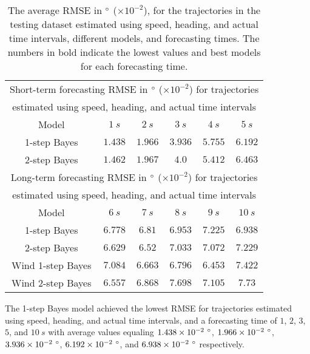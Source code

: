 \documentclass[preprint,12pt]{elsarticle}
\begin{document}
\begin{table}[!ht]
	\centering
	\begin{tabular}{|c|c|c|c|c|c|}
		\hline
		\multicolumn{6}{|c|}{Short-term forecasting RMSE in $\degree$ ($\times 10^{-2}$) for trajectories} \\ 
		\multicolumn{6}{|c|}{estimated using speed, heading, and actual time intervals} \\ \hline
		Model & $1 \ s$ & $2 \ s$ & $3 \ s$ & $4 \ s$ & $5 \ s$ \\ \hline
		1-step Bayes & $\mathbf{1.438}$ & $\mathbf{1.966}$ & $\mathbf{3.936}$ & $5.755$ & $\mathbf{6.192}$ \\ \hline
		2-step Bayes & $1.462$ & $1.967$ & $4.0$ & $\mathbf{5.412}$ & $6.463$ \\ \hline
		\multicolumn{6}{|c|}{Long-term forecasting RMSE in $\degree$ ($\times 10^{-2}$) for trajectories} \\ 
		\multicolumn{6}{|c|}{estimated using speed, heading, and actual time intervals} \\ \hline
		Model & $6 \ s$ & $7 \ s$ & $8 \ s$ & $9 \ s$ & $10 \ s$ \\ \hline
		1-step Bayes & $6.778$ & $6.81$ & $6.953$ & $7.225$ & $\mathbf{6.938}$ \\ \hline
		2-step Bayes & $6.629$ & $\mathbf{6.52}$ & $7.033$ & $7.072$ & $7.229$ \\ \hline
		Wind 1-step Bayes & $7.084$ & $6.663$ & $\mathbf{6.796}$ & $\mathbf{6.453}$ & $7.422$ \\ \hline
		Wind 2-step Bayes & $\mathbf{6.557}$ & $6.868$ & $7.698$ & $7.105$ & $7.73$ \\ \hline
	\end{tabular}
	\caption{The average RMSE in $\degree$ ($\times 10^{-2}$), for the trajectories in the testing dataset estimated using speed, heading, and actual time intervals, different models, and forecasting times. The numbers in bold indicate the lowest values and best models for each forecasting time.}
	\label{tab:best_speed_actual_dir_RMSE}
\end{table}

The 1-step Bayes model achieved the lowest RMSE for trajectories estimated using speed, heading, and actual time intervals, and a forecasting time of $1$, $2$, $3$, $5$, and $10 \ s$ with average values equaling $1.438 \times 10^{-2} \ \degree$, $1.966 \times 10^{-2} \ \degree$, $3.936 \times 10^{-2} \ \degree$, $6.192 \times 10^{-2} \ \degree$, and $6.938 \times 10^{-2} \ \degree$ respectively.
\end{document}

